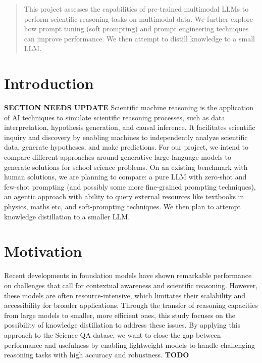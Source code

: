 \documentclass{article}
\begin{document}
\begin{abstract}
This project assesses the capabilities of pre-trained multimodal LLMs to perform scientific reasoning tasks on multimodal data. We further explore how prompt tuning (soft prompting) and prompt engineering techniques can improve performance. We then attempt to distill knowledge to a small LLM.
\end{abstract}
           


\section{Introduction}
\label{introduction}

\textbf{SECTION NEEDS UPDATE}
Scientific machine reasoning is the application of AI techniques to simulate scientific reasoning processes, such as  data interpretation, hypothesis generation, and causal inference. It facilitates scientific inquiry and discovery by enabling machines to independently analyze scientific data, generate hypotheses, and make predictions.
For our project, we intend to compare different approaches around generative large language models to generate solutions for school science problems. On an existing benchmark with human solutions, we are planning to compare: a pure LLM with zero-shot and few-shot prompting (and possibly some more fine-grained prompting techniques), an agentic approach with ability to query external resources like textbooks in physics, maths etc, and soft-prompting techniques. We then plan to attempt knowledge distillation to a smaller LLM. 

\section{Motivation}
Recent developments in foundation models have shown remarkable performance on challenges that call for contextual awareness and scientific reasoning. However, these models are often resource-intensive, which limitates their scalability and accessibility for broader applications. Through the transfer of reasoning capacities from large models to smaller, more efficient ones, this study focuses on the possibility of knowledge distillation to address these issues. By applying this approach to the Science QA datase, we want to close the gap between performance and usefulness by enabling lightweight models to handle challenging reasoning tasks with high accuracy and robustness.
\label{motivation}
\textbf{TODO}
\end{document}
